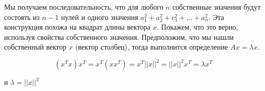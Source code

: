 \documentclass[a4paper,12pt]{article}
\begin{document}
\begin{enumerate}
Мы получаем последовательность, что для любого $n$ собственные значения будут состоять из $n-1$ нулей и одного значения $a_1^2 + a_2^2 + c_3^2+...+a^2_n$.
Эта конструкция похожа на квадрат длины вектора $x$. Покажем, что это верно, используя свойства собственного значения. Предположим, что мы нашли собственный вектор $x$ (вектор столбец), тогда выполнится определение $Ax=\lambda x$.


$$(x^Tx)x^T = x^T(xx^T)=x^T{||x||}^2={||x||}^2x^T=\lambda x^T$$

и $\lambda={||x||}^2$

\end{enumerate}
\end{document}
